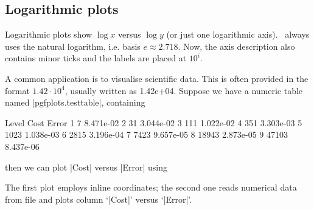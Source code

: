 \subsection{Logarithmic plots}
Logarithmic plots show $\log x$ versus $\log y$  (or just one logarithmic axis). \PGFPlots\ always uses the natural logarithm, i.e. basis $e\approx2.718$. Now, the axis description also contains minor ticks and the labels are placed at $10^i$.
\begin{codeexample}[]
\end{codeexample}
A common application is to visualise scientific data. This is often provided in the format $1.42\cdot10^4$, usually written as 1.42e+04. Suppose we have a numeric table named |pgfplots.testtable|, containing
\begin{codeexample}[code only,tabsize=6]
Level Cost  Error
1     7     8.471e-02
2     31    3.044e-02
3     111   1.022e-02
4     351   3.303e-03
5     1023  1.038e-03
6     2815  3.196e-04
7     7423  9.657e-05
8     18943 2.873e-05
9     47103 8.437e-06
\end{codeexample}
then we can plot |Cost| versus |Error| using
\begin{codeexample}[]
\end{codeexample}
The first plot employs inline coordinates; the second one reads numerical data from file and plots column `|Cost|' versus `|Error|'.

